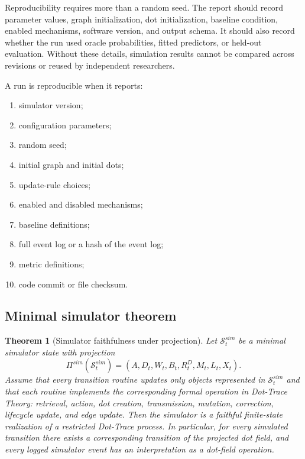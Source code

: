 \documentclass[11pt]{article}
\newtheorem{theorem}{Theorem}
\theoremstyle{remark}
\begin{document}
Reproducibility requires more than a random seed. The report should record parameter values, graph initialization, dot initialization, baseline condition, enabled mechanisms, software version, and output schema. It should also record whether the run used oracle probabilities, fitted predictors, or held-out evaluation. Without these details, simulation results cannot be compared across revisions or reused by independent researchers.


A run is reproducible when it reports:

\begin{enumerate}[leftmargin=*]
\item simulator version;
\item configuration parameters;
\item random seed;
\item initial graph and initial dots;
\item update-rule choices;
\item enabled and disabled mechanisms;
\item baseline definitions;
\item full event log or a hash of the event log;
\item metric definitions;
\item code commit or file checksum.
\end{enumerate}

\subsection{Minimal simulator theorem}\label{minimal-simulator-theorem}

\begin{theorem}[Simulator faithfulness under projection]\label{thm:simulator-faithfulness-projection}
Let $\mathcal S_t^{sim}$ be a minimal simulator state with projection
$$
\Pi^{sim}(\mathcal S_t^{sim})=(A,D_t,W_t,B_t,R_t^D,M_t,L_t,X_t).
$$
Assume that every transition routine updates only objects represented in
$\mathcal S_t^{sim}$ and that each routine implements the corresponding
formal operation in Dot-Trace Theory: retrieval, action, dot creation,
transmission, mutation, correction, lifecycle update, and edge update.
Then the simulator is a faithful finite-state realization of a restricted
Dot-Trace process. In particular, for every simulated transition there
exists a corresponding transition of the projected dot field, and every
logged simulator event has an interpretation as a dot-field operation.
\end{theorem}
\end{document}
